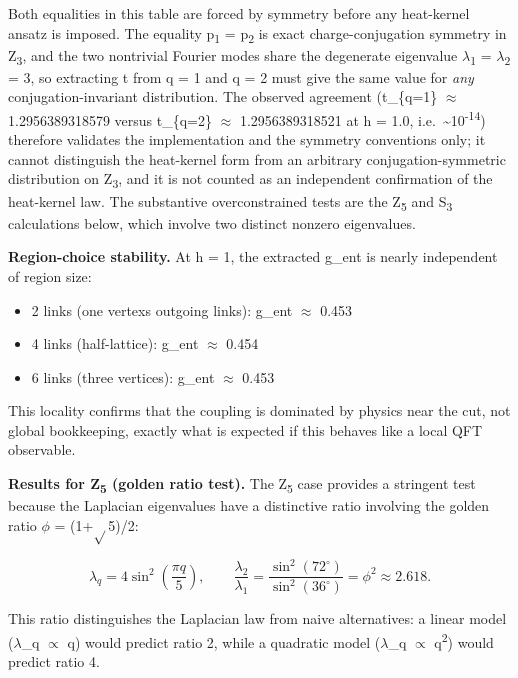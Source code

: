 Both equalities in this table are forced by symmetry before any heat-kernel ansatz is imposed. The equality p\textsubscript{1} = p\textsubscript{2} is exact charge-conjugation symmetry in Z\textsubscript{3}, and the two nontrivial Fourier modes share the degenerate eigenvalue \ensuremath{\lambda}\textsubscript{1} = \ensuremath{\lambda}\textsubscript{2} = 3, so extracting t from q = 1 and q = 2 must give the same value for \emph{any} conjugation-invariant distribution. The observed agreement (t\_\{q=1\} \ensuremath{\approx} 1.2956389318579 versus t\_\{q=2\} \ensuremath{\approx} 1.2956389318521 at h = 1.0, i.e.\ \textasciitilde10\textsuperscript{-}\textsuperscript{1}\textsuperscript{4}) therefore validates the implementation and the symmetry conventions only; it cannot distinguish the heat-kernel form from an arbitrary conjugation-symmetric distribution on Z\textsubscript{3}, and it is not counted as an independent confirmation of the heat-kernel law. The substantive overconstrained tests are the Z\textsubscript{5} and S\textsubscript{3} calculations below, which involve two distinct nonzero eigenvalues.

\textbf{Region-choice stability.} At h = 1, the extracted g\_ent is nearly independent of region size:

\begin{itemize}
\tightlist
\item
  2 links (one vertex\textquotesingle s outgoing links): g\_ent \ensuremath{\approx} 0.453
\item
  4 links (half-lattice): g\_ent \ensuremath{\approx} 0.454
\item
  6 links (three vertices): g\_ent \ensuremath{\approx} 0.453
\end{itemize}

This locality confirms that the coupling is dominated by physics near the cut, not global bookkeeping, exactly what is expected if this behaves like a local QFT observable.

\textbf{Results for Z\textsubscript{5} (golden ratio test).} The Z\textsubscript{5} case provides a stringent test because the Laplacian eigenvalues have a distinctive ratio involving the golden ratio \ensuremath{\phi} = (1+\ensuremath{\sqrt{}}5)/2:

\[
\lambda_q = 4\sin^2\left(\frac{\pi q}{5}\right), \qquad
\frac{\lambda_2}{\lambda_1} = \frac{\sin^2(72^\circ)}{\sin^2(36^\circ)} = \phi^2 \approx 2.618.
\]

This ratio distinguishes the Laplacian law from naive alternatives: a linear model (\ensuremath{\lambda}\_q \ensuremath{\propto} q) would predict ratio 2, while a quadratic model (\ensuremath{\lambda}\_q \ensuremath{\propto} q\textsuperscript{2}) would predict ratio 4.

